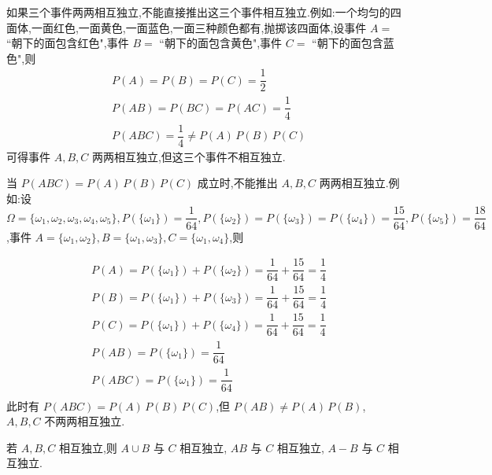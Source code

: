 \begin{note}
    \indent 如果三个事件两两相互独立,不能直接推出这三个事件相互独立.例如:一个均匀的四面体,一面红色,一面黄色,一面蓝色,一面三种颜色都有,抛掷该四面体,设事件 $A=$ ``朝下的面包含红色",事件 $B=$ ``朝下的面包含黄色",事件 $C=$ ``朝下的面包含蓝色",则
    $$
    \begin{aligned}
        & P(A) = P(B) = P(C) = \dfrac{1}{2} \\
        & P(AB) = P(BC) = P(AC) = \dfrac{1}{4} \\
        & P(ABC) = \dfrac{1}{4} \not= P(A) \, P(B) \, P(C)
    \end{aligned}
    $$
    可得事件 $A,B,C$ 两两相互独立,但这三个事件不相互独立.

    当 $P(ABC)=P(A)\,P(B)\,P(C)$ 成立时,不能推出 $A,B,C$ 两两相互独立.例如:设 $\varOmega = \{ \omega_1, \omega_2, \omega_3, \omega_4, \omega_5 \}, P(\{ \omega_1 \}) = \dfrac{1}{64}, P(\{ \omega_2 \}) = P(\{ \omega_3 \}) = P(\{ \omega_4 \}) = \dfrac{15}{64}, P(\{ \omega_5 \}) = \dfrac{18}{64}$,事件 $A = \{ \omega_1, \omega_2 \}, B = \{ \omega_1, \omega_3 \}, C = \{ \omega_1, \omega_4 \}$,则

    $$
    \begin{aligned}
        & P(A) = P(\{ \omega_1 \}) + P(\{ \omega_2 \}) = \dfrac{1}{64} + \dfrac{15}{64} = \dfrac{1}{4} \\
        & P(B) = P(\{ \omega_1 \}) + P(\{ \omega_3 \}) = \dfrac{1}{64} + \dfrac{15}{64} = \dfrac{1}{4} \\
        & P(C) = P(\{ \omega_1 \}) + P(\{ \omega_4 \}) = \dfrac{1}{64} + \dfrac{15}{64} = \dfrac{1}{4} \\
        & P(AB) = P(\{ \omega_1 \}) = \dfrac{1}{64} \\
        & P(ABC) = P(\{ \omega_1 \}) = \dfrac{1}{64} \\
    \end{aligned}
    $$
    此时有 $P(ABC)=P(A)\,P(B)\,P(C)$,但 $P(AB) \not= P(A)\,P(B)$, $A,B,C$ 不两两相互独立.
\end{note}

\begin{conclusion}
    \indent 若 $A,B,C$ 相互独立,则 $A \cup B$ 与 $C$ 相互独立, $AB$ 与 $C$ 相互独立, $A-B$ 与 $C$ 相互独立.
\end{conclusion}

